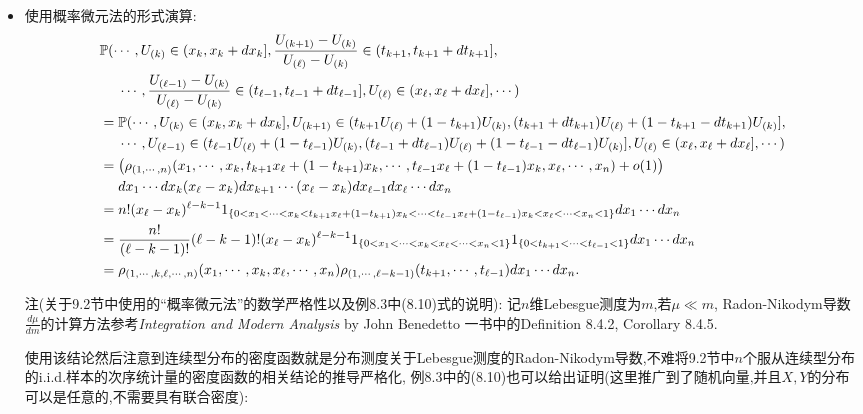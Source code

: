 \begin{itemize}
    \item[定理9.2.3] 使用概率微元法的形式演算:
    \begin{align*}
        &\p(\cdots,U_{(k)}\in(x_k,x_k+dx_k],
        \frac{U_{(k+1)}-U_{(k)}}{U_{(\ell)}-U_{(k)}}\in(t_{k+1},t_{k+1}+dt_{k+1}],\\
        &\quad\ \cdots,\frac{U_{(\ell-1)}-U_{(k)}}{U_{(\ell)}-U_{(k)}}\in(t_{\ell-1},t_{\ell-1}+dt_{\ell-1}],
        U_{(\ell)}\in(x_\ell,x_\ell+dx_\ell],\cdots)\\
        &=\p(\cdots,U_{(k)}\in(x_k,x_k+dx_k],
        U_{(k+1)}\in(t_{k+1}U_{(\ell)}+(1-t_{k+1})U_{(k)},
        (t_{k+1}+dt_{k+1})U_{(\ell)}+(1-t_{k+1}-dt_{k+1})U_{(k)}],\\
        &\quad\ \cdots,U_{(\ell-1)}\in(t_{\ell-1}U_{(\ell)}+(1-t_{\ell-1})U_{(k)},
        (t_{\ell-1}+dt_{\ell-1})U_{(\ell)}+(1-t_{\ell-1}-dt_{\ell-1})U_{(k)}],
        U_{(\ell)}\in(x_\ell,x_\ell+dx_\ell],\cdots)\\
        &=\big(\rho_{(1,\cdots,n)}(x_1,\cdots,x_k,
        t_{k+1}x_{\ell}+(1-t_{k+1})x_k,\cdots,
        t_{\ell-1}x_{\ell}+(1-t_{\ell-1})x_k,x_\ell,\cdots,x_n)+o(1)\big)\\
        &\quad\ dx_1\cdots dx_k(x_\ell-x_k)dx_{k+1}\cdots(x_\ell-x_k)dx_{\ell-1}
        dx_\ell\cdots dx_n\\
        &=n!(x_\ell-x_k)^{\ell-k-1}
        1_{\{0<x_1<\cdots<x_k<t_{k+1}x_{\ell}+(1-t_{k+1})x_k<\cdots
        <t_{\ell-1}x_{\ell}+(1-t_{\ell-1})x_k<x_\ell<\cdots<x_n<1\}}
        dx_1\cdots dx_n\\
        &=\frac{n!}{(\ell-k-1)!}(\ell-k-1)!(x_\ell-x_k)^{\ell-k-1}
        1_{\{0<x_1<\cdots<x_k<x_\ell<\cdots<x_n<1\}}
        1_{\{0<t_{k+1}<\cdots<t_{\ell-1}<1\}}dx_1\cdots dx_n\\
        &=\rho_{(1,\cdots,k,\ell,\cdots,n)}(x_1,\cdots,x_k,x_\ell,\cdots,x_n)
        \rho_{(1,\cdots,\ell-k-1)}(t_{k+1},\cdots,t_{\ell-1})dx_1\cdots dx_n.
    \end{align*}

    注(关于9.2节中使用的“概率微元法”的数学严格性以及例8.3中(8.10)式的说明):
    记$n$维Lebesgue测度为$m$,若$\mu\ll m$, Radon-Nikodym导数$\frac{d\mu}{dm}$的计算方法参考\textit{Integration and Modern Analysis} by John Benedetto 一书中的Definition 8.4.2, Corollary 8.4.5.
    
    使用该结论然后注意到连续型分布的密度函数就是分布测度关于Lebesgue测度的Radon-Nikodym导数,不难将9.2节中$n$个服从连续型分布的i.i.d.样本的次序统计量的密度函数的相关结论的推导严格化,
    例8.3中的(8.10)也可以给出证明(这里推广到了随机向量,并且$X,Y$的分布可以是任意的,不需要具有联合密度):


\end{itemize}
